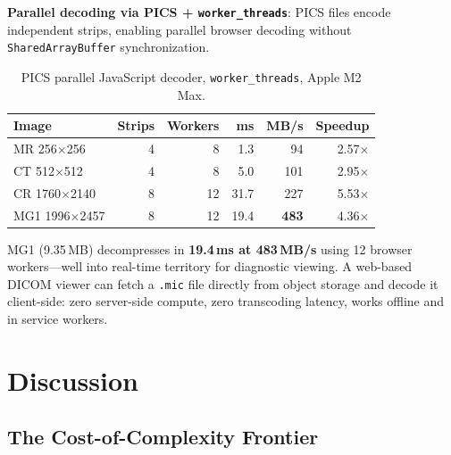 \documentclass[10pt,twocolumn]{article}
\begin{document}
\textbf{Parallel decoding via PICS + \texttt{worker\_threads}}: PICS files encode independent strips, enabling parallel browser decoding without \texttt{SharedArrayBuffer} synchronization.

\begin{table}[h]
  \centering
  \caption{PICS parallel JavaScript decoder, \texttt{worker\_threads}, Apple M2 Max.}
  \label{tab:browser}
  \small
  \begin{tabular}{lrrrrr}
    \toprule
    Image & Strips & Workers & ms & MB/s & Speedup \\
    \midrule
    MR 256$\times$256    & 4 & 8  & 1.3  & 94  & 2.57$\times$ \\
    CT 512$\times$512    & 4 & 8  & 5.0  & 101 & 2.95$\times$ \\
    CR 1760$\times$2140  & 8 & 12 & 31.7 & 227 & 5.53$\times$ \\
    MG1 1996$\times$2457 & 8 & 12 & 19.4 & \textbf{483} & 4.36$\times$ \\
    \bottomrule
  \end{tabular}
\end{table}

MG1 (9.35\,MB) decompresses in \textbf{19.4\,ms at 483\,MB/s} using 12 browser workers---well into real-time territory for diagnostic viewing. A web-based DICOM viewer can fetch a \texttt{.mic} file directly from object storage and decode it client-side: zero server-side compute, zero transcoding latency, works offline and in service workers.

\section{Discussion}
\label{sec:discussion}

\subsection{The Cost-of-Complexity Frontier}
\end{document}
